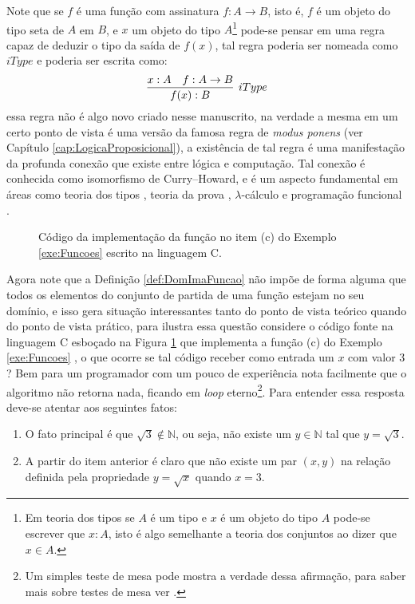 Note que se $f$ é uma função com assinatura $f: A \rightarrow B$, isto é, $f$ é um objeto do tipo seta de $A$ em $B$, e $x$ um objeto do tipo $A$\footnote{Em teoria dos tipos \cite{nederpelt2014, thompson1999} se $A$ é um tipo e $x$ é um objeto do tipo $A$ pode-se escrever que $x:A$, isto é algo semelhante a teoria dos conjuntos ao dizer que $x \in A$.} pode-se pensar em uma regra capaz de deduzir o tipo da saída de $f(x)$, tal regra poderia ser nomeada como $iType$ e poderia ser escrita como:
\begin{equation*}
	\infer[iType]{f(x):B}{x:A & f:A \rightarrow B}
\end{equation*}
essa regra não é algo novo criado nesse manuscrito, na verdade a mesma em um certo ponto de vista é uma versão da famosa regra de \textit{modus ponens} (ver Capítulo \ref{cap:LogicaProposicional}), a existência de tal regra é uma manifestação da profunda conexão que existe entre lógica e computação. Tal conexão é conhecida como isomorfismo de Curry–Howard, e é um aspecto fundamental em áreas como teoria dos tipos \cite{nederpelt2014, thompson1999}, teoria da prova \cite{nederpelt2014, sergey2014}, $\lambda$-cálculo \cite{bare1984, henk1992, bimbo2019} e programação funcional \cite{thompson1999, fmcbook}.

\begin{figure}[h]
	
	\caption{Código da implementação da função no item (c) do Exemplo \ref{exe:Funcoes} escrito na linguagem C.}
	\label{fig:FuncaoSqrt}
\end{figure}

Agora note que a Definição \ref{def:DomImaFuncao} não impõe de forma alguma que todos os elementos do conjunto de partida de uma função estejam no seu domínio, e isso gera situação interessantes tanto do ponto de vista teórico quando do ponto de vista prático, para ilustra essa questão considere o código fonte na linguagem C esboçado na Figura \ref{fig:FuncaoSqrt} que implementa a função (c) do Exemplo \ref{exe:Funcoes} , o que ocorre se tal código receber como entrada um $x$ com valor $3$? Bem para um programador com um pouco de experiência nota facilmente que o algoritmo não retorna nada, ficando em \textit{loop} eterno\footnote{Um simples teste de mesa pode mostra a verdade dessa afirmação, para saber mais sobre testes de mesa ver \cite{medina2006}.}. Para entender essa resposta deve-se atentar aos seguintes fatos:

\begin{enumerate}
	\item O fato principal é que $\sqrt{3} \notin \mathbb{N}$, ou seja, não existe um $y \in \mathbb{N}$ tal que $y = \sqrt{3}$.
	\item A partir do item anterior é claro que não existe um par $(x, y)$ na relação definida pela propriedade $y = \sqrt{x}$ quando $x = 3$.	
\end{enumerate}


